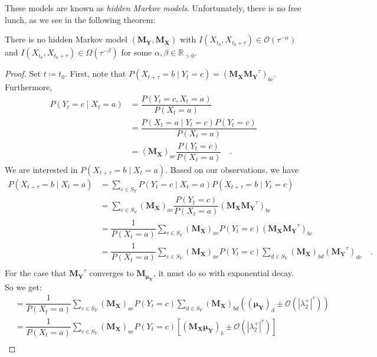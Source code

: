 \documentclass[../../main.tex]{subfiles}
\begin{document}
    These models are known as \emph{hidden Markov models}. Unfortunately, there is no free lunch, as we see in the following theorem:

    \begin{theorem}
        There is no hidden Markov model $(\bm{M_Y}, \bm{M_X})$ with $I(X_{t_0}, X_{t_0 + \tau}) \in \mathcal{O}(\tau^{-\alpha})$ and $I(X_{t_0}, X_{t_0 + \tau}) \in \Omega (\tau^{-\beta})$ for some $\alpha, \beta \in \mathbb{R}_{>0}$.
    \end{theorem}
    \vspace{-2.5em}
    \begin{proof}
        Set $t \coloneqq t_0$. First, note that $P(X_{t + \tau} = b \mid Y_t = c) = (\bm{M_X} \bm{M_Y}^\tau)_{bc}$. Furthermore,
        \begin{align*}
            P(Y_t = c \mid X_t = a) &= \dfrac{P(Y_t = c, X_t = a)}{P(X_t = a)} \\
            &= \dfrac{P(X_t = a \mid Y_t = c) P(Y_t = c)}{P(X_t = a)} \\
            &= (\bm{M_X})_{ac} \dfrac{P(Y_t = c)}{P(X_t = a)} \quad .
        \end{align*}
        We are interested in $P(X_{t + \tau} = b \mid X_t = a)$. Based on our observations, we have
        \begin{align*}
            P(X_{t + \tau} = b \mid X_t = a) &= \sum_{c \in S_Y} P(Y_t = c \mid X_t = a) P(X_{t + \tau} = b \mid Y_t = c) \\
            &= \sum_{c \in S_Y} (\bm{M_X})_{ac} \dfrac{P(Y_t = c)}{P(X_t = a)} (\bm{M_X} \bm{M_Y}^\tau)_{bc} \\
            &= \dfrac{1}{P(X_t = a)} \sum_{c \in S_Y} (\bm{M_X})_{ac} P(Y_t = c) (\bm{M_X} \bm{M_Y}^\tau)_{bc} \\
            &= \dfrac{1}{P(X_t = a)} \sum_{c \in S_Y} (\bm{M_X})_{ac} P(Y_t = c) \sum_{d \in S_Y} (\bm{M_X})_{bd} (\bm{M_Y}^\tau)_{dc} \quad . \\
        \end{align*}
        For the case that $\bm{M_Y}^\tau$ converges to $\bm{M_{\mu_Y}}$, it must do so with exponential decay. So we get:
        \begin{align*}
            &= \dfrac{1}{P(X_t = a)} \sum_{c \in S_Y} (\bm{M_X})_{ac} P(Y_t = c) \sum_{d \in S_Y} (\bm{M_X})_{bd} ((\bm{\mu_Y})_{d} \pm \mathcal{O}(|\lambda_2^+|^\tau)) \\
            &= \dfrac{1}{P(X_t = a)} \sum_{c \in S_Y} (\bm{M_X})_{ac} P(Y_t = c) \left[ (\bm{M_X}\bm{\mu_Y})_{b} \pm \mathcal{O}(|\lambda_2^+|^\tau) \right] \\

\end{align*}
\end{proof}
\end{document}
